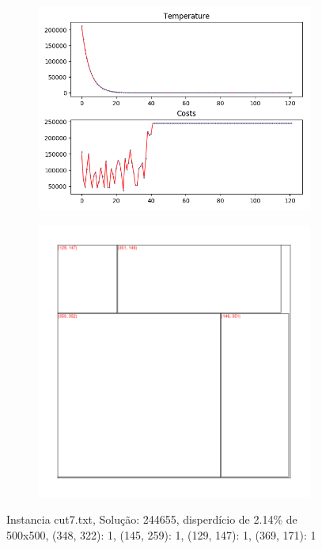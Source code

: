 \begin{figure}
\centering
\begin{subfigure}{.5\textwidth}
  \centering
  \includegraphics[width=1\linewidth]{results/cut7/1/plot}
  \label{fig:sub1}
\end{subfigure}%
\begin{subfigure}{.5\textwidth}
  \centering
  \includegraphics[width=1\linewidth]{results/cut7/1/cut}
  \label{fig:sub2}
\end{subfigure}
\caption{Instancia cut7.txt, Solução: 244655, disperdício de 2.14\% de 500x500, {(348, 322): 1, (145, 259): 1, (129, 147): 1, (369, 171): 1}}
\label{fig:test}
\end{figure}


